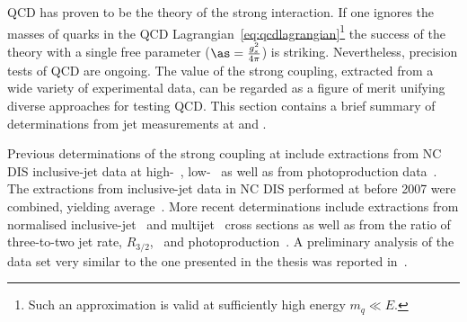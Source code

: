 QCD has proven to be the theory of the strong interaction. If one ignores the masses of quarks in the QCD Lagrangian~\eqref{eq:qcdlagrangian}\footnote{Such an approximation is valid at sufficiently high energy $m_q \ll E$.} the success of the theory with a single free parameter ($\as=\frac{g^2_s}{4\pi}$) is striking. Nevertheless, precision tests of QCD are ongoing. The value of the strong coupling, extracted from a wide variety of experimental data, can be regarded as a figure of merit unifying diverse approaches for testing QCD. This section contains a brief summary of \as determinations from jet measurements at \hera and \lhc.

Previous determinations of the strong coupling at \hera include extractions from NC DIS inclusive-jet data at high-\qsq~\cite{pl:b649:12,Aktas:2007aa}, low-\qsq~\cite{Aaron:2010ac} as well as from photoproduction data~\cite{pl:b560:7}. The extractions from inclusive-jet data in NC DIS performed at \hera before 2007 were combined, yielding \hera average~\cite{upub:zp07125:hp07132}. More recent determinations include extractions from normalised inclusive-jet~\cite{epj:c65:363} and multijet~\cite{epj:c75:65} cross sections as well as from the ratio of three-to-two jet rate, $R_{3/2}$,~\cite{thesis:behr:2010} and photoproduction~\cite{np:b864:1}. A preliminary analysis of the data set very similar to the one presented in the thesis was reported in~\cite{upub:zp10002}.

